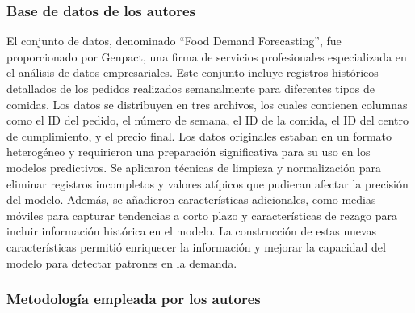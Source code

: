\subsubsection{Base de datos de los autores}
El conjunto de datos, denominado ``Food Demand Forecasting'', fue proporcionado por Genpact, una firma de servicios profesionales especializada en el análisis de datos empresariales. Este conjunto incluye registros históricos detallados de los pedidos realizados semanalmente para diferentes tipos de comidas. Los datos se distribuyen en tres archivos, los cuales contienen columnas como el ID del pedido, el número de semana, el ID de la comida, el ID del centro de cumplimiento, y el precio final.
Los datos originales estaban en un formato heterogéneo y requirieron una preparación significativa para su uso en los modelos predictivos. Se aplicaron técnicas de limpieza y normalización para eliminar registros incompletos y valores atípicos que pudieran afectar la precisión del modelo. Además, se añadieron características adicionales, como medias móviles para capturar tendencias a corto plazo y características de rezago para incluir información histórica en el modelo. La construcción de estas nuevas características permitió enriquecer la información y mejorar la capacidad del modelo para detectar patrones en la demanda.


\subsubsection{Metodología empleada por los autores}

